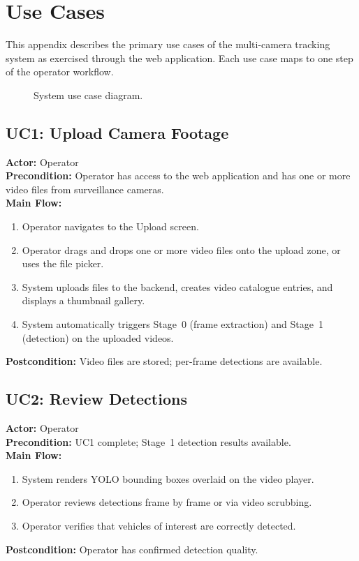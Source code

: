 \chapter{Use Cases}

This appendix describes the primary use cases of the multi-camera tracking system as exercised through the web application. Each use case maps to one step of the operator workflow.

\begin{figure}[htbp]
\centering
{}
\caption{System use case diagram.}
\label{fig:use_case}
\end{figure}

\section*{UC1: Upload Camera Footage}
\textbf{Actor:} Operator \\
\textbf{Precondition:} Operator has access to the web application and has one or more video files from surveillance cameras. \\
\textbf{Main Flow:}
\begin{enumerate}
    \item Operator navigates to the Upload screen.
    \item Operator drags and drops one or more video files onto the upload zone, or uses the file picker.
    \item System uploads files to the backend, creates video catalogue entries, and displays a thumbnail gallery.
    \item System automatically triggers Stage~0 (frame extraction) and Stage~1 (detection) on the uploaded videos.
\end{enumerate}
\textbf{Postcondition:} Video files are stored; per-frame detections are available.

\section*{UC2: Review Detections}
\textbf{Actor:} Operator \\
\textbf{Precondition:} UC1 complete; Stage~1 detection results available. \\
\textbf{Main Flow:}
\begin{enumerate}
    \item System renders YOLO bounding boxes overlaid on the video player.
    \item Operator reviews detections frame by frame or via video scrubbing.
    \item Operator verifies that vehicles of interest are correctly detected.
\end{enumerate}
\textbf{Postcondition:} Operator has confirmed detection quality.

